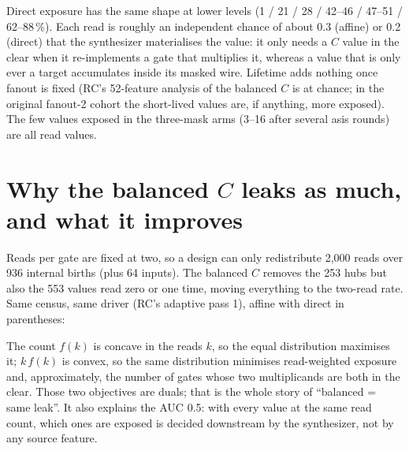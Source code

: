 \documentclass[11pt]{article}
\begin{document}
Direct exposure has the same shape at lower levels (1 / 21 / 28 / 42--46 / 47--51 / 62--88\,\%). Each read is roughly an independent chance of about 0.3 (affine) or 0.2 (direct) that the synthesizer materialises the value: it only needs a $C$ value in the clear when it re-implements a gate that multiplies it, whereas a value that is only ever a target accumulates inside its masked wire. Lifetime adds nothing once fanout is fixed (RC's 52-feature analysis of the balanced $C$ is at chance; in the original fanout-2 cohort the short-lived values are, if anything, more exposed). The few values exposed in the three-mask arms (3--16 after several asis rounds) are all read values.

\section{Why the balanced $C$ leaks as much, and what it improves}
Reads per gate are fixed at two, so a design can only redistribute 2,000 reads over 936 internal births (plus 64 inputs). The balanced $C$ removes the 253 hubs but also the 553 values read zero or one time, moving everything to the two-read rate. Same census, same driver (RC's adaptive pass 1), affine with direct in parentheses:

\begin{center}\footnotesize
{}
\end{center}

The count $f(k)$ is concave in the reads $k$, so the equal distribution maximises it; $k\,f(k)$ is convex, so the same distribution minimises read-weighted exposure and, approximately, the number of gates whose two multiplicands are both in the clear. Those two objectives are duals; that is the whole story of ``balanced = same leak''. It also explains the AUC 0.5: with every value at the same read count, which ones are exposed is decided downstream by the synthesizer, not by any source feature.
\end{document}
